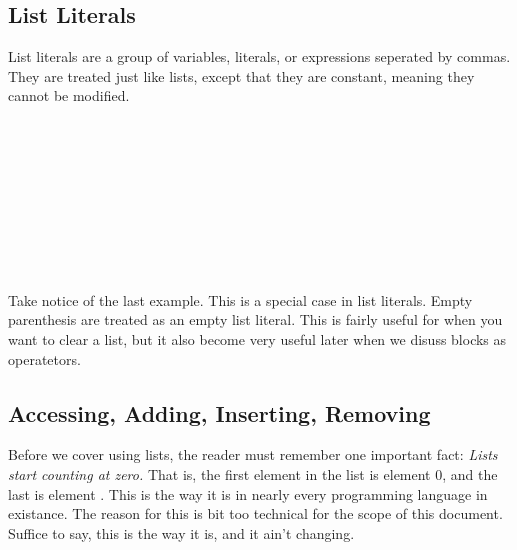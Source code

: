 \documentclass{book}
\begin{document}
\begin{SSCodeBox}
\end{SSCodeBox}



\subsection{List Literals}
List literals are a group of variables, literals, or expressions seperated by commas.  They are treated just like lists, except that they are constant, meaning they cannot be modified.

\begin{SSCodeBox}
\scitea{} \\
 \\
\scitea{, }
\scitea{, }
\scitea{;} \\
\scitea{, }
\scitea{, }
\scitea{;} \\
\scitea{} \\
\scitea{ }
\scitea{;} \\
\scitea{, }
\scitea{, }
\scitea{, }
 \\
\scitea{} \\
\end{SSCodeBox}

Take notice of the last example.  This is a special case in \SSquared list literals.  Empty parenthesis are treated as an empty list literal.  This is fairly useful for when you want to clear a list, but it also become very useful later when we disuss blocks as operatetors.

\subsection{Accessing, Adding, Inserting, Removing}

Before we cover using lists, the reader must remember one important fact: \emph{Lists start counting at zero.}  That is, the first element in the list is element 0, and the last is element .  This is the way it is in nearly every programming language in existance.  The reason for this is bit too technical for the scope of this document.  Suffice to say, this is the way it is, and it ain't changing.
\end{document}
